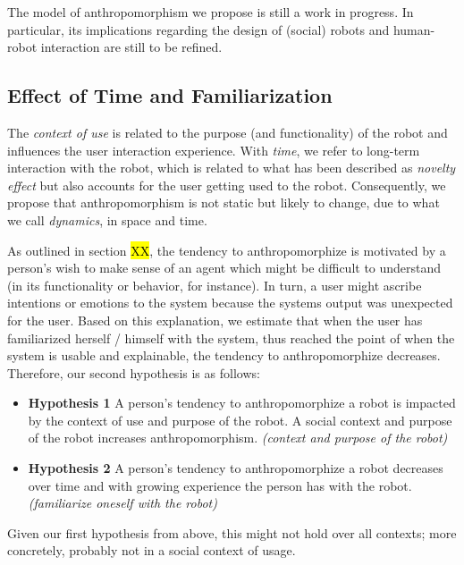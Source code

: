 \documentclass{frontiersSCNS} %
\begin{document}
The model of anthropomorphism we propose is still a work in progress. In
particular, its implications regarding the design of (social) robots and
human-robot interaction are still to be refined.

\subsection{Effect of Time and Familiarization}


The \textit{context of use} is related to the purpose (and functionality) of the
robot and influences the user interaction experience. With \textit{time}, we
refer to long-term interaction with the robot, which is related to what has been
described as \textit{novelty effect} but also accounts for the user getting used
to the robot. Consequently, we propose that anthropomorphism is not static but
likely to change, due to what we call \textit{dynamics}, in space and time.


As outlined in section \hl{XX}, the tendency to anthropomorphize is motivated by
a person's wish to make sense of an agent which might be difficult to understand
(in its functionality or behavior, for instance). In turn, a user might ascribe
intentions or emotions to the system because the systems output was unexpected
for the user. Based on this explanation, we estimate that when the user has
familiarized herself / himself with the system, thus reached the point of when
the system is usable and explainable, the tendency to anthropomorphize
decreases. Therefore, our second hypothesis is as follows: 

\begin{itemize}
    \item \textbf{Hypothesis 1} A person's tendency to anthropomorphize a robot
        is impacted by the context of use and purpose of the robot. A social
        context and purpose of the robot increases anthropomorphism.
        \textit{(context and purpose of the robot)}
	\item \textbf{Hypothesis 2} A person's tendency to anthropomorphize a robot decreases over time and with growing experience the person has with the robot. \textit{(familiarize oneself with the robot)}
\end{itemize}


Given our first hypothesis from above, this might not hold over all contexts;
more concretely, probably not in a social context of usage.
\end{document}
